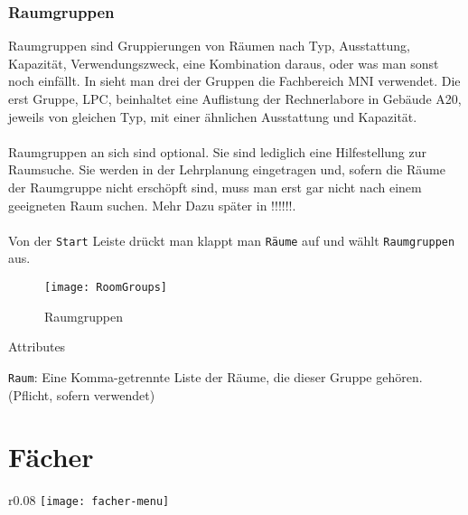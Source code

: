 \subsubsection{Raumgruppen}

Raumgruppen sind Gruppierungen von Räumen nach Typ, Ausstattung, Kapazität, Verwendungszweck, eine Kombination daraus, oder was man sonst noch einfällt. In  sieht man drei der Gruppen die Fachbereich MNI verwendet. Die erst Gruppe, LPC, beinhaltet eine Auflistung der Rechnerlabore in Gebäude A20, jeweils von gleichen Typ, mit einer ähnlichen Ausstattung und Kapazität.\\
\\
Raumgruppen an sich sind optional. Sie sind lediglich eine Hilfestellung zur Raumsuche. Sie werden in der Lehrplanung eingetragen und, sofern die Räume der Raumgruppe nicht erschöpft sind, muss man erst gar nicht nach einem geeigneten Raum suchen. Mehr Dazu später in !!!!!!.\\
\\ 
Von der \texttt{Start} Leiste drückt man klappt man \texttt{Räume} auf und wählt \texttt{Raumgruppen} aus.

\begin{figure}[h]
	\centering
	\texttt{[image: RoomGroups]}
	\vspace{-5pt}
	\caption{Raumgruppen}
	\label{fig:roomgroups}
\end{figure}

\noindent
{\large Attributes\par}
\vspace{8pt}

\noindent
\texttt{Raum}: Eine Komma-getrennte Liste der Räume, die dieser Gruppe gehören. (Pflicht, sofern verwendet)\\

\section{Fächer}

\begin{wrapfigure}{r}{0.08\textwidth}
	\vspace{-80pt}
	\texttt{[image: facher-menu]}
\end{wrapfigure}

\vspace{35pt}

